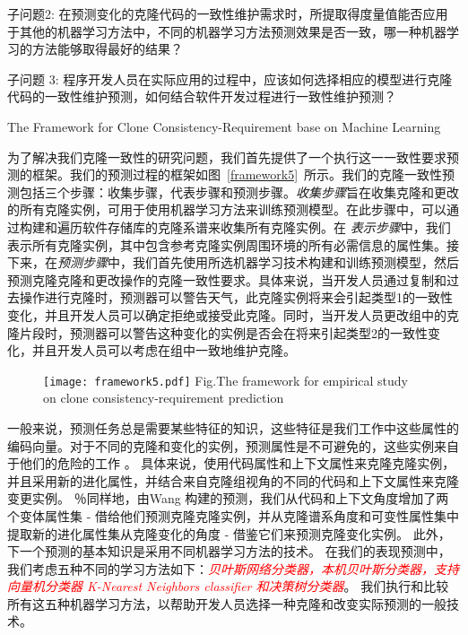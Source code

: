 
子问题2: 在预测变化的克隆代码的一致性维护需求时，所提取得度量值能否应用于其他的机器学习方法中，不同的机器学习方法预测效果是否一致，哪一种机器学习的方法能够取得最好的结果？


子问题 3: 程序开发人员在实际应用的过程中，应该如何选择相应的模型进行克隆代码的一致性维护预测，如何结合软件开发过程进行一致性维护预测？

{The Framework for Clone Consistency-Requirement base on Machine Learning}

为了解决我们克隆一致性的研究问题，我们首先提供了一个执行这一一致性要求预测的框架。我们的预测过程的框架如图~\ref{framework5}~所示。我们的克隆一致性预测包括三个步骤：收集步骤，代表步骤和预测步骤。{\em 收集步骤\/}旨在收集克隆和更改的所有克隆实例，可用于使用机器学习方法来训练预测模型。在此步骤中，可以通过构建和遍历软件存储库的克隆系谱来收集所有克隆实例。在\emph{ 表示步骤\/}中，我们表示所有克隆实例，其中包含参考克隆实例周围环境的所有必需信息的属性集。接下来，在{\em 预测步骤\/}中，我们首先使用所选机器学习技术构建和训练预测模型，然后预测克隆克隆和更改操作的克隆一致性要求。具体来说，当开发人员通过复制和过去操作进行克隆时，预测器可以警告天气，此克隆实例将来会引起类型1的一致性变化，并且开发人员可以确定拒绝或接受此克隆。同时，当开发人员更改组中的克隆片段时，预测器可以警告这种变化的实例是否会在将来引起类型2的一致性变化，并且开发人员可以考虑在组中一致地维护克隆。

\begin{figure}[htbp]
\centering
\texttt{[image: framework5.pdf]}
{Fig.$\!$}{The framework for empirical study on clone consistency-requirement prediction }
\vspace{-1em}
\end{figure}

一般来说，预测任务总是需要某些特征的知识，这些特征是我们工作中这些属性的编码向量。对于不同的克隆和变化的实例，预测属性是不可避免的，这些实例来自于他们的危险的工作\cite{wang2014predicting} \cite{zhang2016predicting}。
具体来说，使用代码属性和上下文属性来克隆克隆实例，并且采用新的进化属性，并结合来自克隆组视角的不同的代码和上下文属性来克隆变更实例。
％同样地，由Wang 构建的预测，我们从代码和上下文角度增加了两个变体属性集 - 借给他们预测克隆克隆实例，并从克隆谱系角度和可变性属性集中提取新的进化属性集从克隆变化的角度 - 借鉴它们来预测克隆变化实例。
此外，下一个预测的基本知识是采用不同机器学习方法的技术。
在我们的表现预测中，我们考虑五种不同的学习方法如下：\textcolor{red}{\em 贝叶斯网络分类器\cite{friedman1997bayesian}，本机贝叶斯分类器\cite{john1995estimating}，支持向量机分类器\cite{platt199912} K-Nearest Neighbors classifier \cite{aha1991instance}和决策树分类器\cite{quinlan2014c4}}。
我们执行和比较所有这五种机器学习方法，以帮助开发人员选择一种克隆和改变实际预测的一般技术。

